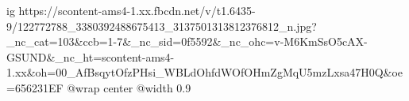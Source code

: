  
 
 
 
 

\ifcmt
  ig https://scontent-ams4-1.xx.fbcdn.net/v/t1.6435-9/122772788_3380392488675413_3137501313812376812_n.jpg?_nc_cat=103&ccb=1-7&_nc_sid=0f5592&_nc_ohc=v-M6KmSsO5cAX-GSUND&_nc_ht=scontent-ams4-1.xx&oh=00_AfBsqytOfzPHsi_WBLdOhfdWOfOHmZgMqU5mzLxsa47H0Q&oe=656231EF
  @wrap center
  @width 0.9
\fi
